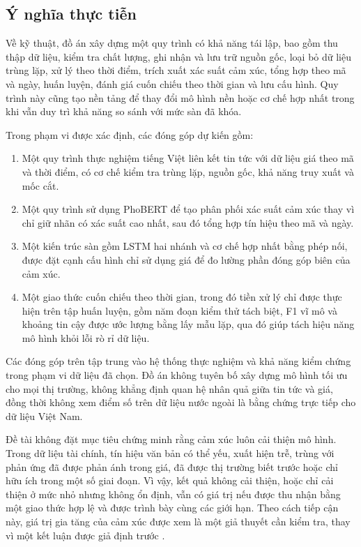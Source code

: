 \documentclass[12pt, a4paper, oneside]{report}
\begin{document}
\subsection{Ý nghĩa thực tiễn}

Về kỹ thuật, đồ án xây dựng một quy trình có khả năng tái lập, bao gồm thu thập dữ liệu,
kiểm tra chất lượng, ghi nhận và lưu trữ nguồn gốc, loại bỏ dữ liệu trùng lặp, xử lý theo
thời điểm, trích xuất xác suất cảm xúc, tổng hợp theo mã và ngày, huấn luyện, đánh giá
cuốn chiếu theo thời gian và lưu cấu hình. Quy trình này cũng tạo nền tảng để thay đổi
mô hình nền hoặc cơ chế hợp nhất trong khi vẫn duy trì khả năng so sánh với mức sàn đã
khóa.

Trong phạm vi được xác định, các đóng góp dự kiến gồm:

\begin{enumerate}[nosep]
  \item Một quy trình thực nghiệm tiếng Việt liên kết tin tức với dữ liệu giá theo mã và
    thời điểm, có cơ chế kiểm tra trùng lặp, nguồn gốc, khả năng truy xuất và mốc cắt.
  \item Một quy trình sử dụng PhoBERT để tạo phân phối xác suất cảm xúc thay vì chỉ giữ
    nhãn có xác suất cao nhất, sau đó tổng hợp tín hiệu theo mã và ngày.
  \item Một kiến trúc sàn gồm LSTM hai nhánh và cơ chế hợp nhất bằng phép nối, được đặt
    cạnh cấu hình chỉ sử dụng giá để đo lường phần đóng góp biên của cảm xúc.
  \item Một giao thức cuốn chiếu theo thời gian, trong đó tiền xử lý chỉ được thực hiện
    trên tập huấn luyện, gồm năm đoạn kiểm thử tách biệt, F1 vĩ mô và khoảng tin cậy
    được ước lượng bằng lấy mẫu lặp, qua đó giúp tách hiệu năng mô hình khỏi lỗi rò rỉ
    dữ liệu.
\end{enumerate}

Các đóng góp trên tập trung vào hệ thống thực nghiệm và khả năng kiểm chứng trong phạm
vi dữ liệu đã chọn. Đồ án không tuyên bố xây dựng mô hình tối ưu cho mọi thị trường,
không khẳng định quan hệ nhân quả giữa tin tức và giá, đồng thời không xem điểm số trên
dữ liệu nước ngoài là bằng chứng trực tiếp cho dữ liệu Việt Nam.

Đề tài không đặt mục tiêu chứng minh rằng cảm xúc luôn cải thiện mô hình. Trong dữ liệu
tài chính, tín hiệu văn bản có thể yếu, xuất hiện trễ, trùng với phản ứng đã được phản
ánh trong giá, đã được thị trường biết trước hoặc chỉ hữu ích trong một số giai đoạn.
Vì vậy, kết quả không cải thiện, hoặc chỉ cải thiện ở mức nhỏ nhưng không ổn định, vẫn
có giá trị nếu được thu nhận bằng một giao thức hợp lệ và được trình bày cùng các giới
hạn. Theo cách tiếp cận này, giá trị gia tăng của cảm xúc được xem là một giả thuyết cần
kiểm tra, thay vì một kết luận được giả định trước
\cite{Jiang2023_230602136v3,Siala2026_260200086v3}.
\end{document}

